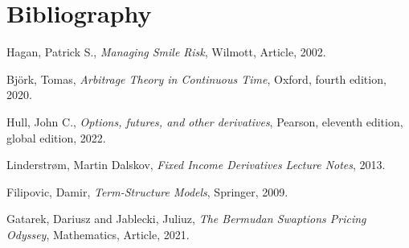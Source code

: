 \clearpage
{}
\section*{Bibliography}
\renewcommand{\refname}{} 

\begin{thebibliography}{25}
Hagan, Patrick S., \emph{Managing Smile Risk},
Wilmott, Article, 2002.

Björk, Tomas, \emph{Arbitrage Theory in Continuous Time},
Oxford, fourth edition, 2020.

Hull, John C., \emph{Options, futures, and other derivatives},
Pearson, eleventh edition, global edition, 2022.

Linderstrøm, Martin Dalskov, \emph{Fixed Income Derivatives Lecture Notes},
2013.

Filipovic, Damir, \emph{Term-Structure Models}, 
Springer, 2009.

Gatarek, Dariusz and Jablecki, Juliuz, \emph{The Bermudan Swaptions Pricing Odyssey},
Mathematics, Article, 2021.
\end{thebibliography}


